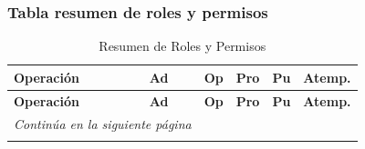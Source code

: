 \subsubsection{Tabla resumen de roles y permisos}

\begin{longtable}[]{
    @{}p{}
    p{}
    p{}
    p{}
    p{}
    p{}@{}}

    \caption{Resumen de Roles y Permisos} \\

    \toprule
    \textbf{Operación} & \textbf{Ad} & \textbf{Op} & \textbf{Pro} & \textbf{Pu} & \textbf{Atemp.} \\
    \midrule
    \endfirsthead %

    \toprule
    \textbf{Operación} & \textbf{Ad} & \textbf{Op} & \textbf{Pro} & \textbf{Pu} & \textbf{Atemp.} \\
    \midrule
    \endhead %

    \midrule
    \multicolumn{2}{r}{\small\emph{Continúa en la siguiente página}} \\
    \endfoot %

    \bottomrule
    \endlastfoot %


\end{longtable}
